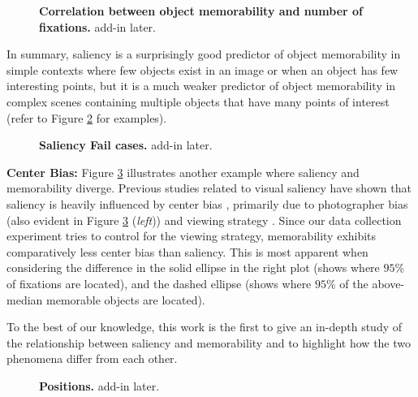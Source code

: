 \begin{figure}[!htb]
\centering
{}
\vspace{-5mm}\caption{\footnotesize\textbf{Correlation between object memorability and number of fixations.} add-in later. }\label{fig:fixCorr}
\end{figure}

In summary, saliency is a surprisingly good predictor of object memorability in simple contexts where few objects exist in an image or when an object has few interesting points, but it is a much weaker predictor of object memorability in complex scenes containing multiple objects that have many points of interest (refer to Figure \ref{fig:fixQual} for examples).

\begin{figure}[!htb]
\centering
{}
\vspace{-5mm}\caption{\footnotesize\textbf{Saliency Fail cases.} add-in later. }\label{fig:fixQual}
\end{figure}


\noindent\textbf{Center Bias: } Figure \ref{fig:fixPos} illustrates another example where saliency and memorability diverge. Previous studies related to visual saliency have shown that saliency is heavily influenced by center bias \cite{judd09,sun08}, primarily due to photographer bias (also evident in Figure \ref{fig:fixPos} (\emph{left})) and viewing strategy \cite{tseng2009}. Since our data collection experiment tries to control for the viewing strategy, memorability exhibits comparatively less center bias than saliency. This is most apparent when considering the difference in the solid ellipse in the right plot (shows where $95\%$ of fixations are located), and the dashed ellipse (shows where $95\%$ of the above-median memorable objects are located).

To the best of our knowledge, this work is the first to give an in-depth study of the relationship between saliency and memorability and to highlight how the two phenomena differ from each other.


\begin{figure}[t]
\centering
{}
\vspace{-5mm}\caption{\footnotesize\textbf{Positions.} add-in later. }\label{fig:fixPos}
\end{figure}




